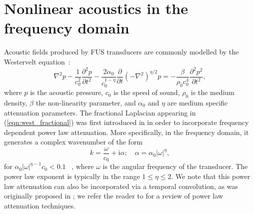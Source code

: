 \documentclass[preprint]{JASA}
\newcommand{\red}[1]{{\color{red} #1}}
\begin{document}
\section{\label{sec:2} Nonlinear acoustics in the frequency domain}
\label{sec:nonlinear_acoustics}
Acoustic fields produced by \red{FUS} transducers are commonly modelled by the 
Westervelt equation~\cite{hamilton1998nonlinear}:
    \begin{equation}
        \nabla^2 p
        - \frac{1}{c_0^2}\frac{\partial^2 p}{\partial t^2} 
        - \frac{2\alpha_0}{c_0^{1-\eta}}\frac{\partial }{\partial t}
        \left( -\nabla^2\right)^{\eta/2}p = 
        -\frac{\beta}{\rho_0 c_0^4}\frac{\partial^2 p^2}{\partial t^2},
        \label{eqn:west_fractional}
    \end{equation}
    where $p$ is the acoustic pressure, $c_0$ is the speed of sound, 
    $\rho_0$ is the medium density, $\beta$ the non-linearity parameter, and 
    $\alpha_0$ and $\eta$ are medium specific attenuation parameters.    
    The fractional Laplacian appearing in (\ref{eqn:west_fractional}) was first 
    introduced in \cite{chen2004fractional} in order to incorporate frequency 
    dependent power law attenuation. More specifically, in the frequency domain, it 
    generates a complex wavenumber of the form
    \begin{equation}
        k = \frac{\omega}{c_0} + \text{i}\alpha;\quad  \alpha=\alpha_0|\omega|^{\eta},
        \label{eqn:power_law}
    \end{equation}
    for $\alpha_0|\omega|^{\eta-1}c_0<0.1$ ~\cite{szabo1994time}, where $\omega$
    is the angular frequency of the transducer.
    The power law exponent is typically in the range 
    $1\leq \eta\leq 2$. We note that this power law attenuation can also be incorporated 
    via a temporal convolution, as was originally proposed in \cite{szabo1994time}; 
    we refer the reader to \cite{treeby2010modeling} for a review of power law 
    attenuation techniques.
    
\end{document}

